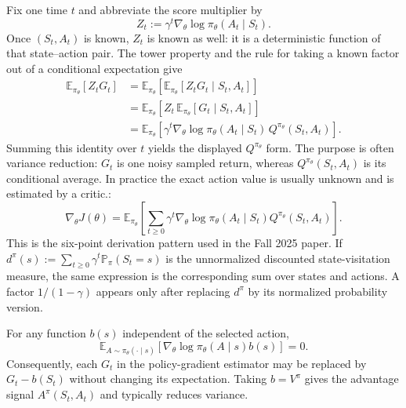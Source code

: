 \documentclass[11pt,a4paper]{article}
\theoremstyle{definition}
\begin{document}
\begin{note}
{Fix one time $t$ and abbreviate the score multiplier by
\[
Z_t
:=\gamma^t\nabla_\theta\log\pi_\theta(A_t\mid S_t).
\]
Once $(S_t,A_t)$ is known, $Z_t$ is known as well: it is a deterministic function of that
state--action pair. The tower property and the rule for taking a known factor out of a
conditional expectation give
\[
\begin{aligned}
\mathbb{E}_{\pi_\theta}[Z_tG_t]
&=\mathbb{E}_{\pi_\theta}\!\left[
\mathbb{E}_{\pi_\theta}[Z_tG_t\mid S_t,A_t]\right]\\
&=\mathbb{E}_{\pi_\theta}\!\left[
Z_t\,\mathbb{E}_{\pi_\theta}[G_t\mid S_t,A_t]\right]\\
&=\mathbb{E}_{\pi_\theta}\!\left[
\gamma^t\nabla_\theta\log\pi_\theta(A_t\mid S_t)\,
Q^{\pi_\theta}(S_t,A_t)\right].
\end{aligned}
\]
Summing this identity over $t$ yields the displayed $Q^{\pi_\theta}$ form. The purpose is
often variance reduction: $G_t$ is one noisy sampled return, whereas
$Q^{\pi_\theta}(S_t,A_t)$ is its conditional average. In practice the exact action value is
usually unknown and is estimated by a critic.}:
\[
\nabla_\theta J(\theta)
=\mathbb{E}_{\pi_\theta}\left[
\sum_{t\geq0}\gamma^t
\nabla_\theta\log\pi_\theta(A_t\mid S_t)
Q^{\pi_\theta}(S_t,A_t)
\right].
\]
This is the six-point derivation pattern used in the Fall 2025 paper. If
$d^\pi(s):=\sum_{t\geq0}\gamma^t\mathbb{P}_\pi(S_t=s)$ is the unnormalized discounted
state-visitation measure, the same expression is the corresponding sum over states and
actions. A factor $1/(1-\gamma)$ appears only after replacing $d^\pi$ by its normalized
probability version.
\end{note}

\begin{theorem}\label{thm:baseline}
For any function $b(s)$ independent of the selected action,
\[
\mathbb{E}_{A\sim\pi_\theta(\cdot\mid s)}
\left[\nabla_\theta\log\pi_\theta(A\mid s)b(s)\right]=0.
\]
Consequently, each $G_t$ in the policy-gradient estimator may be replaced by
$G_t-b(S_t)$ without changing its expectation. Taking $b=V^\pi$ gives the advantage
signal $A^\pi(S_t,A_t)$ and typically reduces variance.
\end{theorem}
\end{document}
